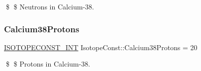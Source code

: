 \$ \$ Neutrons in Calcium-\/38. \mbox{\label{group___isotope_const-_calcium-_ca38_ga34d45151075e5ac1a36426f5cdd66161}} 
\subsubsection{\texorpdfstring{Calcium38\+Protons}{Calcium38Protons}}
{\footnotesize\ttfamily \mbox{\hyperlink{group___isotope_const-_macros_ga5f18360b3e99483a35c32d789e62621c}{I\+S\+O\+T\+O\+P\+E\+C\+O\+N\+S\+T\+\_\+\+I\+NT}} Isotope\+Const\+::\+Calcium38\+Protons = 20}

\$ \$ Protons in Calcium-\/38. 